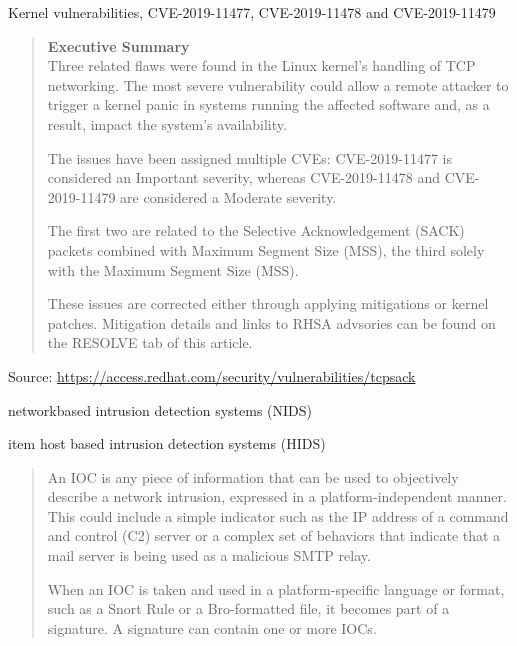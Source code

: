 \documentclass[Screen16to9,17pt]{foils}
\begin{document}

Kernel vulnerabilities, CVE-2019-11477, CVE-2019-11478 and CVE-2019-11479

\begin{quote}\footnotesize{\bf
Executive Summary}\\
Three related flaws were found in the Linux kernel’s handling of TCP networking.  The most severe vulnerability could allow a remote attacker to trigger a kernel panic in systems running the affected software and, as a result, impact the system’s availability.

The issues have been assigned multiple CVEs: CVE-2019-11477 is considered an Important severity, whereas CVE-2019-11478 and CVE-2019-11479 are considered a Moderate severity.

The first two are related to the Selective Acknowledgement (SACK) packets combined with Maximum Segment Size (MSS), the third solely with the Maximum Segment Size (MSS).

These issues are corrected either through applying mitigations or kernel patches.  Mitigation details and links to RHSA advsories can be found on the RESOLVE tab of this article.
\end{quote}

Source: {\footnotesize\url{https://access.redhat.com/security/vulnerabilities/tcpsack}}



\begin{list2}
\item networkbased intrusion detection systems (NIDS)
\item item host based intrusion detection systems (HIDS)
\end{list2}


\begin{quote}\small
An IOC is any piece of information that can be used to objectively describe a
network intrusion, expressed in a platform-independent manner. This could include a simple indicator such as the IP address of a command and control (C2) server or a complex set of behaviors that indicate that a mail server is being used as a malicious SMTP relay.

When an IOC is taken and used in a platform-specific language or format, such as a Snort Rule or a Bro-formatted file, it becomes part of a signature. A signature can contain one or more IOCs.
\end{quote}
\end{document}
